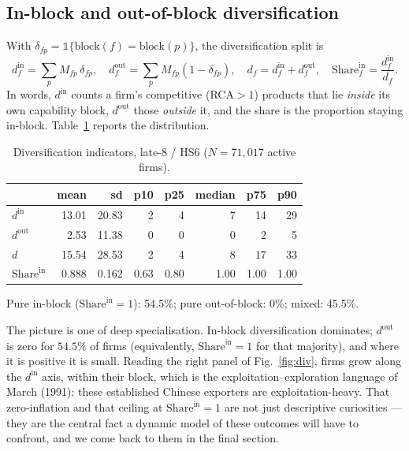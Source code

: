 \documentclass[11pt]{article}
\newcommand{\din}{d^{\mathrm{in}}}
\newcommand{\dout}{d^{\mathrm{out}}}
\begin{document}
\subsection{In-block and out-of-block diversification}

With $\delta_{fp}=\mathbb{1}\{\text{block}(f)=\text{block}(p)\}$, the diversification split is
\begin{equation}
\din_f=\sum_p M_{fp}\,\delta_{fp},\quad
\dout_f=\sum_p M_{fp}(1-\delta_{fp}),\quad
d_f=\din_f+\dout_f,\quad
\mathrm{Share}^{\mathrm{in}}_f=\frac{\din_f}{d_f}.
\end{equation}
In words, $\din$ counts a firm's competitive (RCA$>1$) products that lie \emph{inside} its own capability
block, $\dout$ those \emph{outside} it, and the share is the proportion staying in-block.
Table~\ref{tab:div} reports the distribution.

\begin{table}[H]\centering\small
\caption{Diversification indicators, late-8 / HS6 ($N=71{,}017$ active firms).}
\label{tab:div}
\begin{tabular}{@{}lrrrrrrr@{}}
\toprule
 & mean & sd & p10 & p25 & median & p75 & p90 \\
\midrule
$\din$              & 13.01 & 20.83 & 2 & 4 & 7 & 14 & 29 \\
$\dout$             &  2.53 & 11.38 & 0 & 0 & 0 &  2 &  5 \\
$d$                 & 15.54 & 28.53 & 2 & 4 & 8 & 17 & 33 \\
$\mathrm{Share}^{\mathrm{in}}$ & 0.888 & 0.162 & 0.63 & 0.80 & 1.00 & 1.00 & 1.00 \\
\bottomrule
\end{tabular}

\smallskip
\footnotesize Pure in-block ($\mathrm{Share}^{\mathrm{in}}=1$): 54.5\%; pure out-of-block: 0\%; mixed: 45.5\%.
\end{table}

The picture is one of deep specialisation. In-block diversification dominates; $\dout$ is zero for $54.5\%$ of
firms (equivalently, $\mathrm{Share}^{\mathrm{in}}=1$ for that majority), and where it is positive it is
small. Reading the right panel of Fig.~\ref{fig:div}, firms grow along the $\din$ axis, within their block,
which is the exploitation--exploration language of March (1991): these established Chinese exporters are
exploitation-heavy. That zero-inflation and that ceiling at $\mathrm{Share}^{\mathrm{in}}=1$ are not just
descriptive curiosities --- they are the central fact a dynamic model of these outcomes will have to confront,
and we come back to them in the final section.
\end{document}
